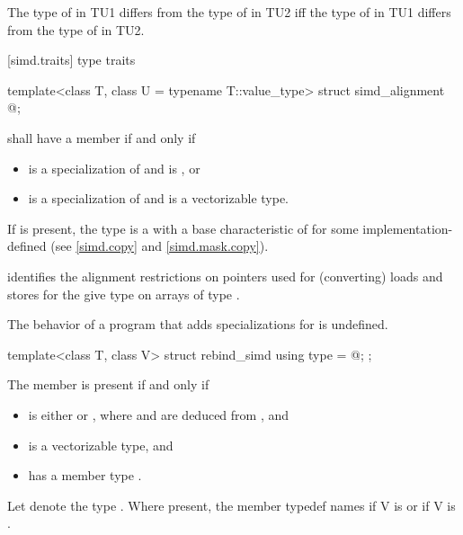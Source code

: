 \pnum
The type of  in TU1 differs from the type of
 in TU2 iff the type of  in TU1
differs from the type of  in TU2.

[simd.traits]{ type traits}

\begin{itemdecl}
template<class T, class U = typename T::value_type> struct simd_alignment { @\seebelow@ };
\end{itemdecl}

\begin{itemdescr}
\pnum
{} shall have a member  if and only if
\begin{itemize}
  \item {} is a specialization of  and  is , or
  \item {} is a specialization of  and  is a vectorizable type.
\end{itemize}

\pnum
If  is present, the type  is a  with a base characteristic of  for some implementation-defined  (see \ref{simd.copy} and \ref{simd.mask.copy}). \begin{note} identifies the alignment restrictions on pointers used for (converting) loads and stores for the give type  on arrays of type .\end{note}

\pnum
The behavior of a program that adds specializations for  is undefined.
\end{itemdescr}

\begin{itemdecl}
template<class T, class V> struct rebind_simd { using type = @\seebelow@; };
\end{itemdecl}

\begin{itemdescr}
  \pnum
  The member  is present if and only if
  \begin{itemize}
    \item {} is either  or , where  and  are deduced from , and
    \item {} is a vectorizable type, and
    \item {} has a member type .
  \end{itemize}

  \pnum
  Let  denote the type .
  Where present, the member typedef  names
   if \tcode V is  or
   if \tcode V is .
\end{itemdescr}

